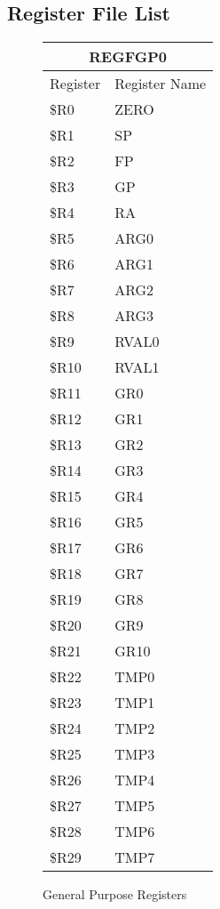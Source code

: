 \documentclass[letterpaper, 11pt]{article}
\begin{document}
\subsection{Register File List}
\begin{figure}[!h]
	\caption{General Purpose Registers}
	\parbox{0.5\linewidth}{
		\centering
		\fontsize{6}{8}\selectfont
		\begin{tabular}{|l|l|}
			\hline
			\multicolumn{2}{|c|}{REGFGP0} \\
			\hline
			Register & Register Name \\ \hline
			\$R0  & ZERO \\ 	\hline
			\$R1  & SP \\ 	\hline
			\$R2  & FP \\ 	\hline
			\$R3  & GP \\ 	\hline
			\$R4  & RA \\ 	\hline
			\$R5  & ARG0 \\ 	\hline
			\$R6  & ARG1 \\ 	\hline
			\$R7  & ARG2 \\ 	\hline
			\$R8  & ARG3 \\ 	\hline
			\$R9  & RVAL0 \\ 	\hline
			\$R10 & RVAL1 \\ \hline
			\$R11 & GR0  \\ \hline
			\$R12 & GR1  \\ \hline
			\$R13 & GR2  \\ \hline
			\$R14 & GR3  \\ \hline
			\$R15 & GR4  \\ \hline
			\$R16 & GR5  \\ \hline
			\$R17 & GR6  \\ \hline
			\$R18 & GR7  \\ \hline
			\$R19 & GR8  \\ \hline
			\$R20 & GR9  \\ \hline
			\$R21 & GR10  \\ \hline
			\$R22 & TMP0  \\ \hline
			\$R23 & TMP1 \\ \hline
			\$R24 & TMP2  \\ \hline
			\$R25 & TMP3  \\ \hline
			\$R26 & TMP4  \\ \hline
			\$R27 & TMP5  \\ \hline
			\$R28 & TMP6  \\ \hline
			\$R29 & TMP7  \\ \hline

\end{tabular}}
\end{figure}
\end{document}
